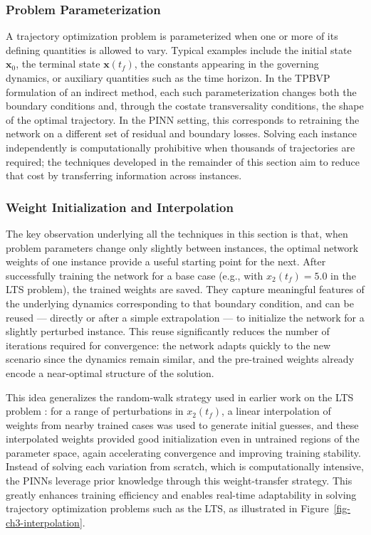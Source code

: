 \documentclass[
  number,
  preprint]{elsarticle}
\begin{document}
\subsubsection{Problem Parameterization}\label{problem-parameterization}

A trajectory optimization problem is parameterized when one or more of
its defining quantities is allowed to vary. Typical examples include the
initial state \(\mathbf{x}_0\), the terminal state \(\mathbf{x}(t_f)\),
the constants appearing in the governing dynamics, or auxiliary
quantities such as the time horizon. In the TPBVP formulation of an
indirect method, each such parameterization changes both the boundary
conditions and, through the costate transversality conditions, the shape
of the optimal trajectory. In the PINN setting, this corresponds to
retraining the network on a different set of residual and boundary
losses. Solving each instance independently is computationally
prohibitive when thousands of trajectories are required; the techniques
developed in the remainder of this section aim to reduce that cost by
transferring information across instances.

\subsubsection{Weight Initialization and
Interpolation}\label{weight-initialization-and-interpolation}

The key observation underlying all the techniques in this section is
that, when problem parameters change only slightly between instances,
the optimal network weights of one instance provide a useful starting
point for the next. After successfully training the network for a base
case (e.g., with \(x_2(t_f) = 5.0\) in the LTS problem), the trained
weights are saved. They capture meaningful features of the underlying
dynamics corresponding to that boundary condition, and can be reused ---
directly or after a simple extrapolation --- to initialize the network
for a slightly perturbed instance. This reuse significantly reduces the
number of iterations required for convergence: the network adapts
quickly to the new scenario since the dynamics remain similar, and the
pre-trained weights already encode a near-optimal structure of the
solution.

This idea generalizes the random-walk strategy used in earlier work on
the LTS problem \citep{izzo2017survey}: for a range of perturbations in
\(x_2(t_f)\), a linear interpolation of weights from nearby trained
cases was used to generate initial guesses, and these interpolated
weights provided good initialization even in untrained regions of the
parameter space, again accelerating convergence and improving training
stability. Instead of solving each variation from scratch, which is
computationally intensive, the PINNs leverage prior knowledge through
this weight-transfer strategy. This greatly enhances training efficiency
and enables real-time adaptability in solving trajectory optimization
problems such as the LTS, as illustrated in
Figure~\ref{fig-ch3-interpolation}.
\end{document}
